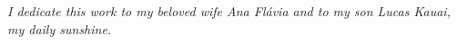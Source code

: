 
\vspace*{\fill}

\begin{flushright}

      \parbox{8cm}{

    {
      \fontsize{12}{14} 
      \selectfont 


      \textit{I dedicate this work to my beloved wife Ana Fl\'avia and to my son
      Lucas Kauai, my daily sunshine.}

    } 
      }
\end{flushright}

\vspace*{7cm}

